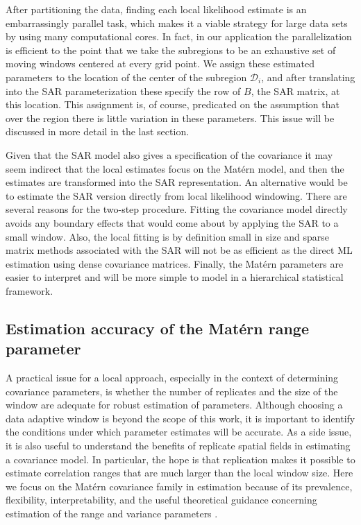 \documentclass[review]{elsarticle}
\begin{document}
After partitioning the data, finding each local likelihood estimate is an embarrassingly parallel task,
 which makes it a viable strategy for large data sets by using many computational cores. In fact, in our application the parallelization is efficient to the point that we take  the subregions to be an exhaustive set of moving windows centered at every grid point. 
We assign these estimated parameters to the location of the center of the subregion $\mathcal{D}_i$, and
after translating into the SAR parameterization these specify the row of $B$, the SAR matrix, at this location. This assignment is, of course, predicated on the assumption that over the region there is little variation in these parameters. This issue will be discussed in more detail in the last section. 

Given that the SAR model also gives a specification of the covariance it may seem indirect that the local estimates focus on the Mat\'ern model, and then the estimates are transformed into the SAR representation. An alternative would be to estimate the SAR version directly from local likelihood windowing. There are several  reasons for the two-step procedure. Fitting the covariance model directly avoids any boundary effects that would come about by applying the SAR to a small window. Also, the local fitting is by definition small in size and sparse matrix methods associated with the SAR will not be as efficient as the direct ML estimation using dense covariance matrices.  Finally, the Mat\'ern parameters are easier to interpret and will be more simple to model in a hierarchical statistical framework. 

\subsection{Estimation accuracy of the Mat\'ern range parameter}
\label{ss:2}
A practical issue for a local approach, especially in the context of determining covariance parameters, is whether the number of replicates and the size of the window are adequate for robust estimation of  parameters. 
Although choosing a data adaptive window is beyond the scope of this work, it is important to identify the conditions under which parameter estimates will be accurate. As a side issue, it is also useful to understand the benefits of replicate spatial fields in estimating a covariance model. In particular, the hope is that replication makes it possible to estimate correlation ranges that are much larger than the local window size. 
Here we  focus on the Mat\'ern covariance family in estimation because of its prevalence, flexibility, interpretability, and the useful theoretical guidance  concerning estimation of the range and variance parameters \cite{kaufman2013role}. 
\end{document}
